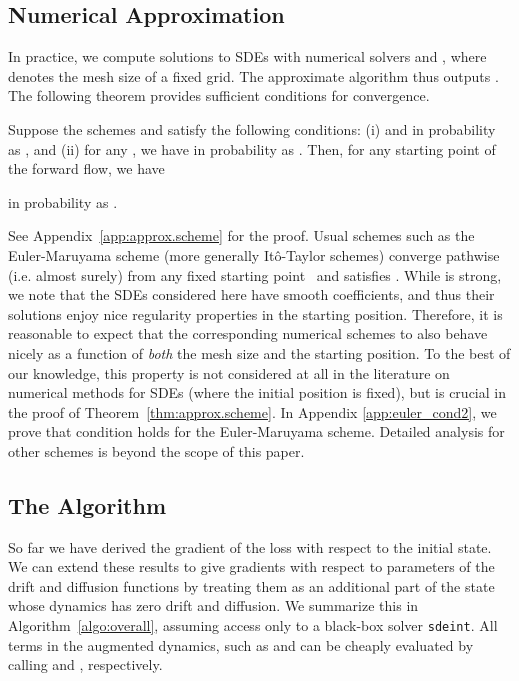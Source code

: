 \documentclass[twoside]{article}
\begin{document}
\subsection{Numerical Approximation} \label{subsec:numerical_approximation}
In practice, we compute solutions to SDEs with numerical solvers  and , where  denotes the mesh size of a fixed grid. The approximate algorithm thus outputs . The following theorem provides sufficient conditions for convergence. 

\begin{theo} \label{thm:approx.scheme}
Suppose the schemes  and  satisfy the following conditions: (i)  and  in probability as , and (ii) for any , we have  in probability as . Then, for any starting point  of the forward flow, we have

in probability as .
\end{theo}

See Appendix~\ref{app:approx.scheme} for the proof. 
Usual schemes such as the Euler-Maruyama scheme (more generally It\^o-Taylor schemes) converge pathwise (i.e. almost surely) from any fixed starting point~\cite{kloeden2007pathwise} and satisfies . 
While  is strong, we note that the SDEs considered here have smooth coefficients, and thus their solutions enjoy nice regularity properties in the starting position. 
Therefore, it is reasonable to expect that the corresponding numerical schemes to also behave nicely as a function of \textit{both} the mesh size and the starting position. 
To the best of our knowledge, this property is not considered at all in the literature on numerical methods for SDEs (where the initial position is fixed), but is crucial in the proof of Theorem~\ref{thm:approx.scheme}. 
In Appendix \ref{app:euler_cond2}, we prove that condition  holds for the Euler-Maruyama scheme.
Detailed analysis for other schemes is beyond the scope of this paper.



\subsection{The Algorithm}\label{subsec:the_algorithm}
So far we have derived the gradient of the loss with respect to the initial state. 
We can extend these results to give gradients with respect to parameters of the drift and diffusion functions by treating them as an additional part of the state whose dynamics has zero drift and diffusion.
We summarize this in Algorithm~\ref{algo:overall}, assuming access only to a black-box solver \texttt{sdeint}.
All terms in the augmented dynamics, such as  and  can be cheaply evaluated by calling  and , respectively.	
\end{document}
